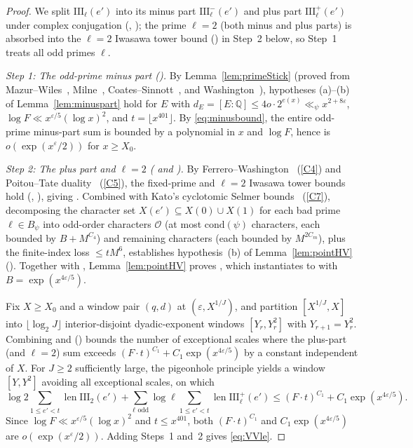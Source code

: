 \documentclass[11pt]{amsart}
\newcommand{\Q}{\mathbb{Q}}
\newcommand{\eps}{\varepsilon}
\newcommand{\Sha}{\mathrm{III}}
\DeclareMathOperator{\len}{len}
\theoremstyle{plain}
\theoremstyle{definition}
\numberwithin{equation}{section}
\begin{document}
\begin{proof}
We split $\Sha_\ell(e')$ into its minus part $\Sha_\ell^-(e')$ and plus part $\Sha_\ell^+(e')$
under complex conjugation (, ); the prime
$\ell=2$ (both minus and plus parts) is absorbed into the $\ell=2$ Iwasawa tower bound
() in Step~2 below, so Step~1 treats all odd primes $\ell$.

\emph{Step 1: The odd-prime minus part ().}
By Lemma~\ref{lem:primeStick} (proved from Mazur--Wiles~\cite[Ch.~1, \S10]{mazur-wiles},
Milne~\cite[Ch.~I, Thm.~4.10]{milne}, Coates--Sinnott~\cite[Thm.~1.3]{coates-sinnott}, and
Washington~\cite[Ch.~4, Prop.~4.1; Ch.~6, Thm.~6.10]{washington}), hypotheses (a)--(b) of
Lemma~\ref{lem:minuspart} hold for $E$ with $d_E=[E:\Q]\le 4o\cdot 2^{e(x)}\ll_\psi x^{2+8\eps}$,
$\log F\ll x^{\eps/5}(\log x)^2$, and $t=\lfloor x^{401}\rfloor$. By \eqref{eq:minusbound}, the
entire odd-prime minus-part sum is bounded by a polynomial in $x$ and $\log F$, hence is
$o(\exp(x^\eps/2))$ for $x\ge X_0$.

\emph{Step 2: The plus part and $\ell=2$ ( and ).}
By Ferrero--Washington~\cite[Main Theorem, p.~377]{ferrero-washington} (\ref{C4}) and
Poitou--Tate duality~\cite[Ch.~I, Thm.~4.10]{milne} (\ref{C5}), the fixed-prime and $\ell=2$
Iwasawa tower bounds hold (, ), giving . Combined
with Kato's cyclotomic Selmer bounds~\cite[Thm.~12.5]{kato-euler} (\ref{C7}), decomposing the
character set $X(e')\subseteq X(0)\cup X(1)$ for each bad prime $\ell\in B_\psi$ into odd-order
characters $\mathcal O$ (at most $\mathrm{cond}(\psi)$ characters, each bounded by $B+M^{C_4}$)
and remaining characters (each bounded by $M^{2C_m}$), plus the finite-index loss $\le tM^6$,
establishes hypothesis~(b) of Lemma~\ref{lem:pointHV} (). Together with ,
Lemma~\ref{lem:pointHV} proves , which instantiates to  with
$B=\exp(x^{4\eps/5})$.

Fix $X\ge X_0$ and a window pair $(q,d)$ at $(\eps,X^{1/J})$, and partition $[X^{1/J},X]$ into
$\lfloor\log_2 J\rfloor$ interior-disjoint dyadic-exponent windows $[Y_r,Y_r^2]$ with
$Y_{r+1}=Y_r^2$. Combining  and  () bounds the
number of exceptional scales where the plus-part (and $\ell=2$) sum exceeds
$(F\cdot t)^{C_1}+C_1\exp(x^{4\eps/5})$ by a constant independent of $X$. For $J\ge2$ sufficiently large, the pigeonhole principle yields a window $[Y,Y^2]$ avoiding all
exceptional scales, on which
\[
\log 2\sum_{1\le e'<t}\len\Sha_2(e')+\sum_{\ell\text{ odd}}\log\ell\sum_{1\le e'<t}\len\Sha_\ell^+(e')\le
(F\cdot t)^{C_1}+C_1\exp(x^{4\eps/5}).
\]
Since $\log F\ll x^{\eps/5}(\log x)^2$ and $t\le x^{401}$, both $(F\cdot t)^{C_1}$ and
$C_1\exp(x^{4\eps/5})$ are $o(\exp(x^\eps/2))$. Adding Steps~1 and~2 gives \eqref{eq:VVle}.
\end{proof}
\end{document}
